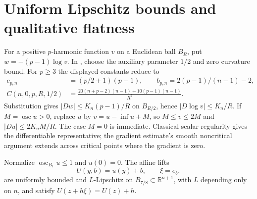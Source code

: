 \documentclass[11pt]{article}
\theoremstyle{remark}\newtheorem{remark}[theorem]{Remark}
\newcommand{\osc}{\operatorname{osc}}
\newcommand{\R}{\mathbb R}
\begin{document}
\section{Uniform Lipschitz bounds and qualitative flatness}

For a positive $p$-harmonic function $v$ on a Euclidean ball $B_R$,
put $w=-(p-1)\log v$. In \cite[Theorem 1.1]{KotschwarNi}, choose
the auxiliary parameter $1/2$ and zero curvature bound. For $p\geq3$
the displayed constants reduce to
\[
 \begin{split}
 c_{p,n}&=(p/2+1)(p-1),\qquad
 b_{p,n}=2(p-1)/(n-1)-2,\\
 C(n,0,p,R,1/2)&=
 \frac{20(n+p-2)(n-1)+10(p-1)(n-1)}{R^2}.
 \end{split}
\]
Substitution gives $|Dw|\leq K_n(p-1)/R$ on $B_{R/2}$, hence
$|D\log v|\leq K_n/R$. If $M=\osc u>0$, replace $u$ by
$v=u-\inf u+M$, so $M\leq v\leq2M$ and
$|Du|\leq2K_nM/R$. The case $M=0$ is immediate. Classical scalar
regularity gives the differentiable representative; the gradient
estimate's smooth noncritical argument extends across critical points
where the gradient is zero.

Normalize $\osc_{B_1}u\leq1$ and $u(0)=0$. The affine lifts
\[
 U(y,b)=u(y)+b,\qquad \xi=e_b,
\]
are uniformly bounded and $L$-Lipschitz on $B_{7/8}\subset\R^{n+1}$,
with $L$ depending only on $n$, and satisfy
$U(z+h\xi)=U(z)+h$.
\end{document}
